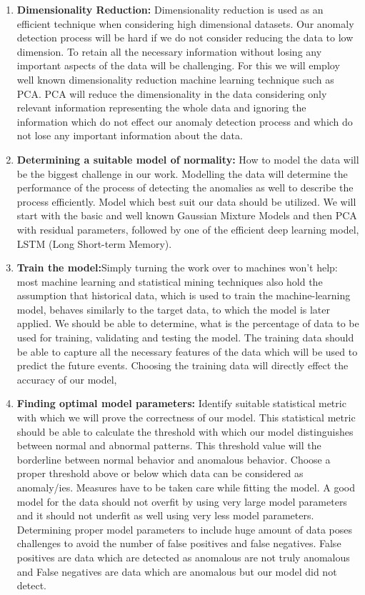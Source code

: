 \begin{enumerate}
\item \textbf{Dimensionality Reduction:} Dimensionality reduction is used as an efficient technique when considering high dimensional datasets. Our anomaly detection process will be hard if we do not consider reducing the data to low dimension. To retain all the necessary information without losing any important aspects of the data will be challenging. For this we will employ well known dimensionality reduction machine learning technique such as PCA. PCA will reduce the dimensionality in the data considering only relevant information representing the whole data and ignoring the information which do not effect our anomaly detection process and which do not lose any important information about the data.

\item \textbf{Determining a suitable model of normality:} How to model the data will be the biggest challenge in our work. Modelling the data will determine the performance of the process of detecting the anomalies as well to describe the process efficiently. Model which best suit our data should be utilized. We will start with the basic and well known Gaussian Mixture Models and then PCA with residual parameters, followed by one of the efficient deep learning model, LSTM (Long Short-term Memory).
 
\item \textbf{Train the model:}Simply turning the work over to machines won’t help: most machine learning and statistical mining techniques also hold the assumption that historical data, which is used to train the machine-learning model, behaves similarly to the target data, to which the model is later applied. We should be able to determine, what is the percentage of data to be used for training, validating and testing the model. The training data should be able to capture all the necessary features of the data which will be used to predict the future events. Choosing the training data will directly effect the accuracy of our model, 

\item \textbf{Finding optimal model parameters:}  Identify suitable statistical metric with which we will prove the correctness of our model. This statistical metric should be able to calculate the threshold with which our model distinguishes between normal and abnormal patterns. This threshold value will the borderline between normal behavior and anomalous behavior. Choose a proper threshold above or below which data can be considered as anomaly/ies. Measures have to be taken care while fitting the model. A good model for the data should not overfit by using very large model parameters and it should not underfit as well using very less model parameters. Determining proper model parameters to include huge amount of data poses challenges to avoid the number of false positives and false negatives. False positives are data which are detected as anomalous are not truly anomalous and False negatives are data which are anomalous but our model did not detect.


\end{enumerate}
